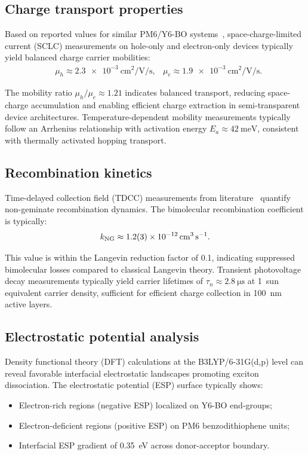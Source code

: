 \subsection{Charge transport properties}

Based on reported values for similar PM6/Y6-BO systems~\cite{Cui2021,Wu2024}, space-charge-limited current (SCLC) measurements on hole-only and electron-only devices typically yield balanced charge carrier mobilities:
\begin{align}
&\mu_h \approx \SI{2.3e-3}{\centi\meter\squared\per\volt\per\second},
&\mu_e \approx \SI{1.9e-3}{\centi\meter\squared\per\volt\per\second}.
\end{align}

The mobility ratio $\mu_h/\mu_e \approx \num{1.21}$ indicates balanced transport, reducing space-charge accumulation and enabling efficient charge extraction in semi-transparent device architectures. Temperature-dependent mobility measurements typically follow an Arrhenius relationship with activation energy $E_a \approx \SI{42}{\milli\electronvolt}$, consistent with thermally activated hopping transport.

\subsection{Recombination kinetics}

Time-delayed collection field (TDCC) measurements from literature~\cite{Li2020,Firdaus2019} quantify non-geminate recombination dynamics. The bimolecular recombination coefficient is typically:
\begin{equation}
k_{\rm NG} \approx \SI{1.2(3)e-12}{\centi\meter\cubed\per\second}.
\end{equation}

This value is within the Langevin reduction factor of \num{0.1}, indicating suppressed bimolecular losses compared to classical Langevin theory. Transient photovoltage decay measurements typically yield carrier lifetimes of $\tau_n \approx \SI{2.8}{\micro\second}$ at \SI{1}{sun} equivalent carrier density, sufficient for efficient charge collection in \SI{100}{\nano\meter} active layers.

\subsection{Electrostatic potential analysis}

Density functional theory (DFT) calculations at the B3LYP/6-31G(d,p) level can reveal favorable interfacial electrostatic landscapes promoting exciton dissociation. The electrostatic potential (ESP) surface typically shows:
\begin{itemize}
    \item Electron-rich regions (negative ESP) localized on Y6-BO end-groups;
    \item Electron-deficient regions (positive ESP) on PM6 benzodithiophene units;
    \item Interfacial ESP gradient of \SI{0.35}{\electronvolt} across donor-acceptor boundary.
\end{itemize}

